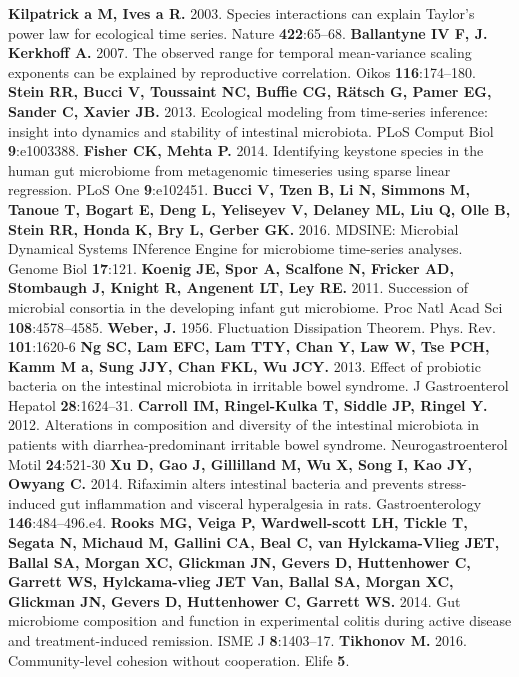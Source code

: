 \documentclass[12pt,oneside,letterpaper]{article}
\begin{document}
\begin{thebibliography}{99}
 {\bf Kilpatrick a M, Ives a R.} 2003. Species interactions can explain Taylor’s power law for ecological time series. Nature {\bf 422}:65–68.
 {\bf Ballantyne IV F, J. Kerkhoff A.} 2007. The observed range for temporal mean-variance scaling exponents can be explained by reproductive correlation. Oikos {\bf 116}:174–180.
 {\bf Stein RR, Bucci V, Toussaint NC, Buffie CG, Rätsch G, Pamer EG, Sander C, Xavier JB.}  2013. Ecological modeling from time-series inference: insight into dynamics and stability of intestinal microbiota. PLoS Comput Biol {\bf 9}:e1003388.
 {\bf Fisher CK, Mehta P.} 2014. Identifying keystone species in the human gut microbiome from metagenomic timeseries using sparse linear regression. PLoS One {\bf 9}:e102451.
  {\bf Bucci V, Tzen B, Li N, Simmons M, Tanoue T, Bogart E, Deng L, Yeliseyev V, Delaney ML, Liu Q, Olle B, Stein RR, Honda K, Bry L, Gerber GK.} 2016. MDSINE: Microbial Dynamical Systems INference Engine for microbiome time-series analyses. Genome Biol {\bf 17}:121.
 {\bf Koenig JE, Spor A, Scalfone N, Fricker AD, Stombaugh J, Knight R, Angenent LT, Ley RE.} 2011. Succession of microbial consortia in the developing infant gut microbiome. Proc Natl Acad Sci {\bf 108}:4578–4585.
 {\bf Weber, J.} 1956. Fluctuation Dissipation Theorem. Phys. Rev. {\bf 101}:1620-6
 {\bf Ng SC, Lam EFC, Lam TTY, Chan Y, Law W, Tse PCH, Kamm M a, Sung JJY, Chan FKL, Wu JCY.} 2013. Effect of probiotic bacteria on the intestinal microbiota in irritable bowel syndrome. J Gastroenterol Hepatol {\bf 28}:1624–31.
 {\bf Carroll IM, Ringel-Kulka T, Siddle JP, Ringel Y.} 2012. Alterations in composition and diversity of the intestinal microbiota in patients with diarrhea-predominant irritable bowel syndrome. Neurogastroenterol Motil {\bf 24}:521-30
 {\bf Xu D, Gao J, Gillilland M, Wu X, Song I, Kao JY, Owyang C.} 2014. Rifaximin alters intestinal bacteria and prevents stress-induced gut inflammation and visceral hyperalgesia in rats. Gastroenterology {\bf 146}:484–496.e4.
 {\bf Rooks MG, Veiga P, Wardwell-scott LH, Tickle T, Segata N, Michaud M, Gallini CA, Beal C, van Hylckama-Vlieg JET, Ballal SA, Morgan XC, Glickman JN, Gevers D, Huttenhower C, Garrett WS, Hylckama-vlieg JET Van, Ballal SA, Morgan XC, Glickman JN, Gevers D, Huttenhower C, Garrett WS.} 2014. Gut microbiome composition and function in experimental colitis during active disease and treatment-induced remission. ISME J {\bf 8}:1403–17.
 {\bf  Tikhonov M.} 2016. Community-level cohesion without cooperation. Elife {\bf 5}. 


\end{thebibliography}
\end{document}
